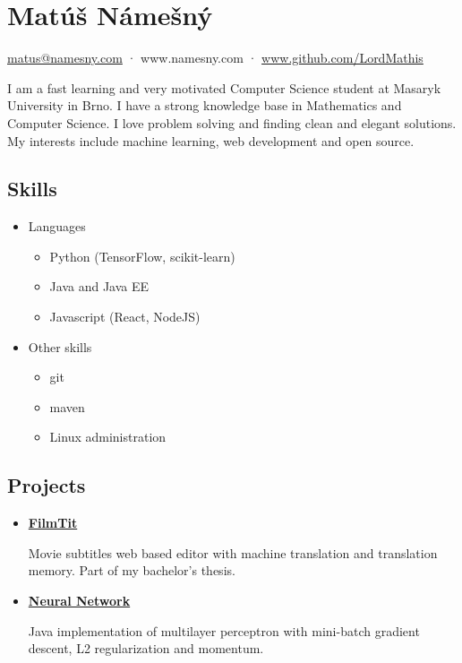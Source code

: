 \documentclass[a4,12pt]{article}
\providecommand{\tightlist}{%
  \setlength{\itemsep}{0pt}\setlength{\parskip}{0pt}}
\begin{document}
\section*{Matúš Námešný}


\begin{center}
\href{mailto:matus@namesny.com}{matus@namesny.com} · www.namesny.com · \href{www.github.com/LordMathis}{www.github.com/LordMathis}
\end{center}

I am a fast learning and very motivated Computer Science student at
Masaryk University in Brno. I have a strong knowledge base in
Mathematics and Computer Science. I love problem solving and finding
clean and elegant solutions. My interests include machine learning, web
development and open source.


\subsection*{Skills}\label{skills}

\begin{itemize}
\tightlist
\item
  Languages
  \begin{itemize}
  \tightlist
  \item
    Python (TensorFlow, scikit-learn)
  \item
    Java and Java EE
  \item
    Javascript (React, NodeJS)
  \end{itemize}
\item
  Other skills
  \begin{itemize}
  \tightlist
  \item
    git
  \item
    maven
  \item
    Linux administration
  \end{itemize}
\end{itemize}

\subsection*{Projects}\label{projects}

\begin{itemize}
\item
  \textbf{\href{https://www.github.com/LordMathis/FilmTit}{FilmTit}}

  Movie subtitles web based editor with machine translation and
  translation memory. Part of my bachelor's thesis.
  
\item
    \textbf{\href{https://github.com/LordMathis/ArtificialNeuralNetwork}{Neural Network}}

    Java implementation of multilayer perceptron with mini-batch gradient descent, L2 regularization and momentum.

\end{itemize}
\end{document}
